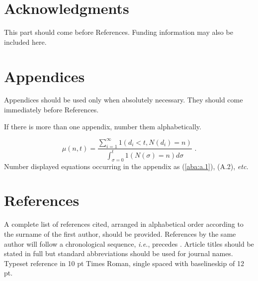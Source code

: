 \documentclass{ws-jai}
\begin{document}
\section*{Acknowledgments}
This part should come before References. Funding information may also be included here.

\section*{Appendices}
Appendices should be used only
when absolutely necessary. They should come immediately before
References.

\appendix{} %
If there is more than one appendix, number them alphabetically.

\noindent
\begin{equation}
\mu(n, t) = \frac{\displaystyle\sum^\infty_{i=1} 1(d_i < t, N(d_i) = n)}
{\displaystyle\int^t_{\sigma=0} 1(N(\sigma) = n)d\sigma}\,\,
.\label{aba:a.1}
\end{equation}
Number displayed equations occurring in the appendix as (\ref{aba:a.1}),
(A.2), {\it etc.}

\section*{References}
\noindent A complete list of references cited, arranged in
alphabetical order according to the surname of the first author,
should be provided. References by the same author will follow a
chronological sequence, {\it i.e.}, \cite{Lie00} precedes \cite{Lie01}.
Article titles should be stated in full but standard abbreviations
should be used for journal names. Typeset reference in 10 pt Times
Roman, single spaced with baselineskip of 12 pt.
\end{document}
